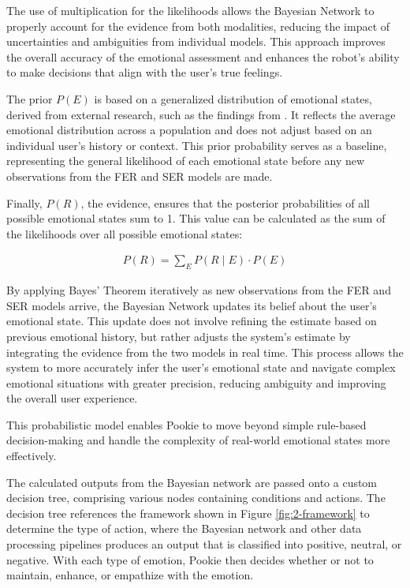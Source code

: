 The use of multiplication for the likelihoods allows the Bayesian Network to properly account for the evidence from both modalities, reducing the impact of uncertainties and ambiguities from individual models. This approach improves the overall accuracy of the emotional assessment and enhances the robot's ability to make decisions that align with the user's true feelings.

The prior \( P(E) \) is based on a generalized distribution of emotional states, derived from external research, such as the findings from \cite{10.1371/journal.pone.0145450}. It reflects the average emotional distribution across a population and does not adjust based on an individual user’s history or context. This prior probability serves as a baseline, representing the general likelihood of each emotional state before any new observations from the FER and SER models are made.

Finally, \( P(R) \), the evidence, ensures that the posterior probabilities of all possible emotional states sum to 1. This value can be calculated as the sum of the likelihoods over all possible emotional states:

\begin{gather}
    P(R) = \sum_{E} P(R \mid E) \cdot P(E)
\end{gather}

By applying Bayes’ Theorem iteratively as new observations from the FER and SER models arrive, the Bayesian Network updates its belief about the user's emotional state. This update does not involve refining the estimate based on previous emotional history, but rather adjusts the system’s estimate by integrating the evidence from the two models in real time. This process allows the system to more accurately infer the user’s emotional state and navigate complex emotional situations with greater precision, reducing ambiguity and improving the overall user experience.

This probabilistic model enables Pookie to move beyond simple rule-based decision-making and handle the complexity of real-world emotional states more effectively.

The calculated outputs from the Bayesian network are passed onto a custom decision tree, comprising various nodes containing conditions and actions. The decision tree references the framework shown in Figure \ref{fig:2-framework} to determine the type of action, where the Bayesian network and other data processing pipelines produces an output that is classified into positive, neutral, or negative. With each type of emotion, Pookie then decides whether or not to maintain, enhance, or empathize with the emotion. 

